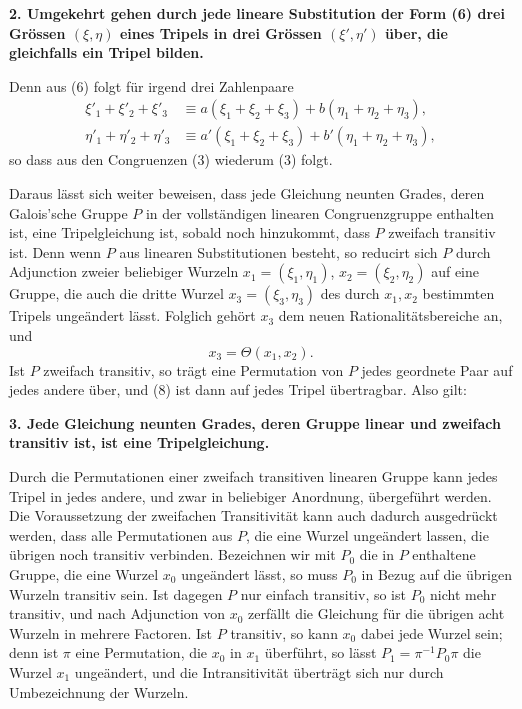 \documentclass[11pt]{article}
\begin{document}
\textbf{2. Umgekehrt gehen durch jede lineare Substitution der Form (6) drei Grössen \((\xi,\eta)\) eines Tripels in drei Grössen \((\xi',\eta')\) über, die gleichfalls ein Tripel bilden.}

Denn aus (6) folgt für irgend drei Zahlenpaare
\begin{equation}
\begin{aligned}
 \xi'_1+\xi'_2+\xi'_3&\equiv a(\xi_1+\xi_2+\xi_3)+b(\eta_1+\eta_2+\eta_3),\\
 \eta'_1+\eta'_2+\eta'_3&\equiv a'(\xi_1+\xi_2+\xi_3)+b'(\eta_1+\eta_2+\eta_3),
\end{aligned}
\tag{7}
\end{equation}
so dass aus den Congruenzen (3) wiederum (3) folgt.

Daraus lässt sich weiter beweisen, dass jede Gleichung neunten Grades, deren Galois'sche Gruppe \(P\) in der vollständigen linearen Congruenzgruppe enthalten ist, eine Tripelgleichung ist, sobald noch hinzukommt, dass \(P\) zweifach transitiv ist. Denn wenn \(P\) aus linearen Substitutionen besteht, so reducirt sich \(P\) durch Adjunction zweier beliebiger Wurzeln \(x_1=(\xi_1,\eta_1)\), \(x_2=(\xi_2,\eta_2)\) auf eine Gruppe, die auch die dritte Wurzel \(x_3=(\xi_3,\eta_3)\) des durch \(x_1,x_2\) bestimmten Tripels ungeändert lässt. Folglich gehört \(x_3\) dem neuen Rationalitätsbereiche an, und
\begin{equation}
 x_3=\Theta(x_1,x_2).
 \tag{8}
\end{equation}
Ist \(P\) zweifach transitiv, so trägt eine Permutation von \(P\) jedes geordnete Paar auf jedes andere über, und (8) ist dann auf jedes Tripel übertragbar. Also gilt:

\textbf{3. Jede Gleichung neunten Grades, deren Gruppe linear und zweifach transitiv ist, ist eine Tripelgleichung.}

Durch die Permutationen einer zweifach transitiven linearen Gruppe kann jedes Tripel in jedes andere, und zwar in beliebiger Anordnung, übergeführt werden. Die Voraussetzung der zweifachen Transitivität kann auch dadurch ausgedrückt werden, dass alle Permutationen aus \(P\), die eine Wurzel ungeändert lassen, die übrigen noch transitiv verbinden. Bezeichnen wir mit \(P_0\) die in \(P\) enthaltene Gruppe, die eine Wurzel \(x_0\) ungeändert lässt, so muss \(P_0\) in Bezug auf die übrigen Wurzeln transitiv sein. Ist dagegen \(P\) nur einfach transitiv, so ist \(P_0\) nicht mehr transitiv, und nach Adjunction von \(x_0\) zerfällt die Gleichung für die übrigen acht Wurzeln in mehrere Factoren. Ist \(P\) transitiv, so kann \(x_0\) dabei jede Wurzel sein; denn ist \(\pi\) eine Permutation, die \(x_0\) in \(x_1\) überführt, so lässt \(P_1=\pi^{-1}P_0\pi\) die Wurzel \(x_1\) ungeändert, und die Intransitivität überträgt sich nur durch Umbezeichnung der Wurzeln.
\end{document}
